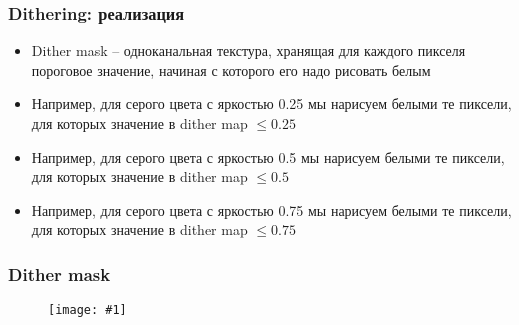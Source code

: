 \documentclass[10pt]{beamer}
\newcommand{\slideimage}[1]{
  \begin{figure}
    \begin{adjustbox}{width=\textwidth, totalheight=\textheight-2\baselineskip-2\baselineskip,keepaspectratio}
      \texttt{[image: \#1]}
    \end{adjustbox}
  \end{figure}
}
\begin{document}
\begin{frame}[fragile]
\frametitle{Dithering: реализация}
\begin{itemize}
\item Dither mask -- одноканальная текстура, хранящая для каждого пикселя пороговое значение, начиная с которого его надо рисовать белым
\pause
\item Например, для серого цвета с яркостью 0.25 мы нарисуем белыми те пиксели, для которых значение в dither map \begin{math}\leq 0.25\end{math}
\pause
\item Например, для серого цвета с яркостью 0.5 мы нарисуем белыми те пиксели, для которых значение в dither map \begin{math}\leq 0.5\end{math}
\pause
\item Например, для серого цвета с яркостью 0.75 мы нарисуем белыми те пиксели, для которых значение в dither map \begin{math}\leq 0.75\end{math}
\end{itemize}
\end{frame}

\begin{frame}[fragile]
\frametitle{Dither mask}
\slideimage{dither-mask.png}
\end{frame}
\end{document}

